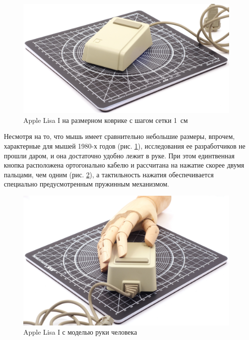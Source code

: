 \documentclass[11pt, a4paper]{article}
\begin{document}
\begin{figure}[h]
    \centering
    \includegraphics[scale=0.4]{1983_apple_lisa_mouse/applekovrik_60.jpg}
    \caption{Apple Lisa I на размерном коврике с шагом сетки 1~см}
    \label{fig:AppleLisaSize}
\end{figure}

Несмотря на то, что мышь имеет сравнительно небольшие размеры, впрочем, характерные для мышей 1980-х годов (рис. \ref{fig:AppleLisaSize}), исследования ее разработчиков не прошли даром, и она достаточно удобно лежит в руке. При этом единтвенная кнопка расположена ортогонально кабелю и рассчитана на нажатие скорее двумя пальцами, чем одним (рис. \ref{fig:AppleLisaHand}), а тактильность нажатия обеспечивается специально предусмотренным пружинным механизмом.

\begin{figure}[h]
    \centering
    \includegraphics[scale=0.4]{1983_apple_lisa_mouse/appleruka_60.jpg}
    \caption{Apple Lisa I с моделью руки человека}
    \label{fig:AppleLisaHand}
\end{figure}
\end{document}
